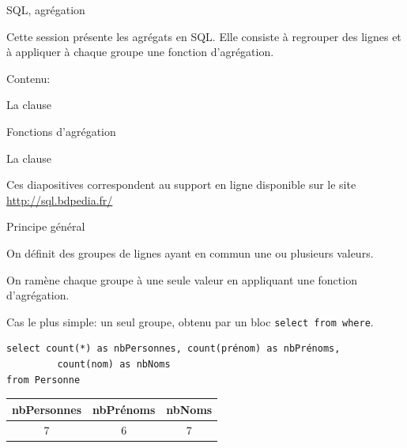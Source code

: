
\begin{frame}[fragile]{SQL, agrégation}

Cette session présente les agrégats en SQL. Elle consiste à regrouper des lignes
et à appliquer à chaque groupe une fonction d'agrégation.

\vfill

Contenu:

\begin{redbullet}
  \item La clause 
  \item Fonctions d'agrégation
  \item La clause 
\end{redbullet}

\vfill
\begin{blocgauche}
\alert{Ces diapositives correspondent au support en ligne disponible sur
le site \url{http://sql.bdpedia.fr/}}
\end{blocgauche}

\end{frame}

\begin{frame}[fragile]{Principe général}

On définit des \alert{groupes} de lignes ayant en commun une ou plusieurs valeurs.

\vfill

On ramène chaque groupe à une seule valeur en appliquant une \alert{fonction d'agrégation}.

\vfill

Cas le plus simple: un seul groupe, obtenu par un bloc \texttt{select from where}.


\begin{verbatim}
select count(*) as nbPersonnes, count(prénom) as nbPrénoms, 
         count(nom) as nbNoms
from Personne
\end{verbatim}

\vfill

\begin{tabular}{c|c|c}
\textbf{nbPersonnes} & \textbf{nbPrénoms} & \textbf{nbNoms}\\ \hline 
7 & 6 & 7\\ \hline 
\end{tabular}

\end{frame}

